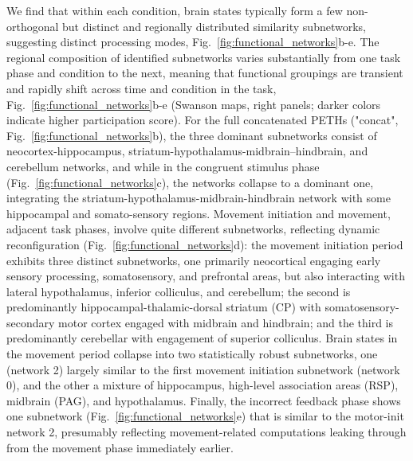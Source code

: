 We find that within each condition, brain states typically form a few non-orthogonal but distinct and regionally distributed similarity subnetworks, suggesting distinct processing modes, Fig.~\ref{fig:functional_networks}b-e. The regional composition of identified subnetworks varies substantially from one task phase and condition to the next, meaning that functional groupings are transient and rapidly shift across time and condition in the task, Fig.~\ref{fig:functional_networks}b-e (Swanson maps, right panels; darker colors indicate higher participation score). 
For the full concatenated PETHs ("concat", Fig.~\ref{fig:functional_networks}b), the three dominant subnetworks consist of neocortex-hippocampus, striatum-hypothalamus-midbrain–hindbrain, and cerebellum networks, and while in the congruent stimulus phase (Fig.~\ref{fig:functional_networks}c), the networks collapse to a dominant one, integrating the striatum-hypothalamus-midbrain-hindbrain network with some hippocampal and somato-sensory regions.
Movement initiation and movement, adjacent task phases, involve quite different subnetworks, reflecting dynamic reconfiguration (Fig.~\ref{fig:functional_networks}d): the movement initiation period exhibits three distinct subnetworks, one primarily neocortical engaging early sensory processing, somatosensory, and prefrontal areas, but also interacting with lateral hypothalamus, inferior colliculus, and cerebellum; the second is predominantly hippocampal-thalamic-dorsal striatum (CP) with somatosensory-secondary motor cortex engaged with midbrain and hindbrain; and the third is predominantly cerebellar with engagement of superior colliculus. Brain states in the movement period collapse into two statistically robust subnetworks, one (network 2) largely similar to the first movement initiation subnetwork (network 0), and the other a mixture of hippocampus, high-level association areas (RSP), midbrain (PAG), and hypothalamus. Finally, the incorrect feedback phase shows one subnetwork (Fig.~\ref{fig:functional_networks}e) that is similar to the motor-init network 2, presumably reflecting movement-related computations leaking through from the movement phase immediately earlier. 

